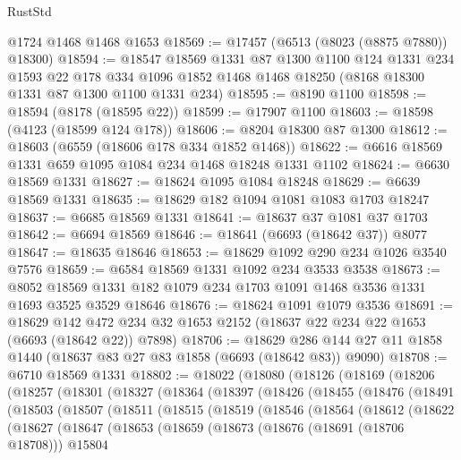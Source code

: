 \begin{lexlean}{RustStd}
\begin{coremodule}
    @1724
    @1468
    @1468
    @1653
@18569 := @17457 (@6513 (@8023 (@8875 @7880)) @18300)
@18594 := @18547
    @18569
    @1331
    @87
    @1300
    @1100
    @124
    @1331
    @234
    @1593
    @22
    @178
    @334
    @1096
    @1852
    @1468
    @1468
    @18250
    (@8168 @18300 @1331 @87 @1300 @1100 @1331 @234)
@18595 := @8190 @1100
@18598 := @18594 (@8178 (@18595 @22))
@18599 := @17907 @1100
@18603 := @18598 (@4123 (@18599 @124 @178))
@18606 := @8204 @18300 @87 @1300
@18612 := @18603 (@6559 (@18606 @178 @334 @1852 @1468))
@18622 := @6616 @18569 @1331 @659 @1095 @1084 @234 @1468 @18248 @1331 @1102
@18624 := @6630 @18569 @1331
@18627 := @18624 @1095 @1084 @18248
@18629 := @6639 @18569 @1331
@18635 := @18629 @182 @1094 @1081 @1083 @1703 @18247
@18637 := @6685 @18569 @1331
@18641 := @18637 @37 @1081 @37 @1703
@18642 := @6694 @18569
@18646 := @18641 (@6693 (@18642 @37)) @8077
@18647 := @18635 @18646
@18653 := @18629 @1092 @290 @234 @1026 @3540 @7576
@18659 := @6584 @18569 @1331 @1092 @234 @3533 @3538
@18673 := @8052 @18569 @1331 @182 @1079 @234 @1703 @1091 @1468 @3536 @1331 @1693 @3525 @3529 @18646
@18676 := @18624 @1091 @1079 @3536
@18691 := @18629
    @142
    @472
    @234
    @32
    @1653
    @2152
    (@18637 @22 @234 @22 @1653 (@6693 (@18642 @22)) @7898)
@18706 := @18629 @286 @144 @27 @11 @1858 @1440 (@18637 @83 @27 @83 @1858 (@6693 (@18642 @83)) @9090)
@18708 := @6710 @18569 @1331
@18802 := @18022
    (@18080
      (@18126
        (@18169
          (@18206
            (@18257
              (@18301
                (@18327
                  (@18364
                    (@18397
                      (@18426
                        (@18455
                          (@18476
                            (@18491
                              (@18503
                                (@18507
                                  (@18511
                                    (@18515
                                      (@18519
                                        (@18546
                                          (@18564
                                            (@18612
                                              (@18622
                                                (@18627
                                                  (@18647
                                                    (@18653
                                                      (@18659
                                                        (@18673
                                                          (@18676 (@18691 (@18706 @18708)))
                                                          @15804

\end{coremodule}
\end{lexlean}

